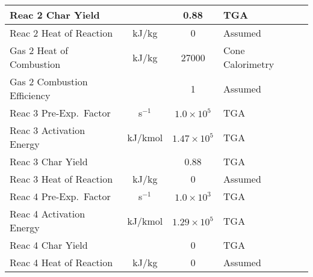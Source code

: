 \begin{table}[p]
\begin{center}
\begin{tabular}{|l|c|c|l|l|}
Reac 2 Char Yield           &               & 0.88                              & TGA                       &  \cite{Oztekin:CF2012}                  \\ \hline
Reac 2 Heat of Reaction     & kJ/kg         & 0                                 & Assumed                   &  \cite{Oztekin:CF2012}                  \\ \hline
Gas 2 Heat of Combustion    & kJ/kg         & 27000                             & Cone Calorimetry          &  \cite{Oztekin:CF2012}                  \\ \hline
Gas 2 Combustion Efficiency &               & 1                                 & Assumed                   &  \cite{Oztekin:CF2012}                  \\ \hline
Reac 3 Pre-Exp.~Factor      & s$^{-1}$      & $1.0 \times 10^5$                 & TGA                       &  \cite{Oztekin:CF2012}                  \\ \hline
Reac 3 Activation Energy    & kJ/kmol       & $1.47 \times 10^5$                & TGA                       &  \cite{Oztekin:CF2012}                  \\ \hline
Reac 3 Char Yield           &               & 0.88                              & TGA                       &  \cite{Oztekin:CF2012}                  \\ \hline
Reac 3 Heat of Reaction     & kJ/kg         & 0                                 & Assumed                   &  \cite{Oztekin:CF2012}                  \\ \hline
Reac 4 Pre-Exp.~Factor      & s$^{-1}$      & $1.0 \times 10^3$                 & TGA                       &  \cite{Oztekin:CF2012}                  \\ \hline
Reac 4 Activation Energy    & kJ/kmol       & $1.29 \times 10^5$                & TGA                       &  \cite{Oztekin:CF2012}                  \\ \hline
Reac 4 Char Yield           &               & 0                                 & TGA                       &  \cite{Oztekin:CF2012}                  \\ \hline
Reac 4 Heat of Reaction     & kJ/kg         & 0                                 & Assumed                   &  \cite{Oztekin:CF2012}                  \\ \hline
\end{tabular}
\end{center}
\label{Properties_PEEK}
\end{table}

